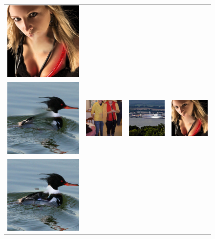 \begin{figure}[H]
\begin{tabular}{cccc}
  \includegraphics[width=.24\textwidth]{figures/imagenet/0197_ce2.jpg}\\
  \includegraphics[width=.24\textwidth]{figures/imagenet/0011_nps2.jpg}&
  \includegraphics[width=.24\textwidth]{figures/imagenet/0034_nps2.jpg}&
  \includegraphics[width=.24\textwidth]{figures/imagenet/0165_nps2.jpg}&
  \includegraphics[width=.24\textwidth]{figures/imagenet/0197_nps2.jpg}\\
  \includegraphics[width=.24\textwidth]{figures/imagenet/imagenet_0011_siggraph2017.png}&

\end{tabular}
\end{figure}
